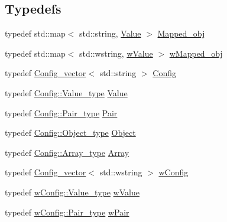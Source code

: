 \subsection*{Typedefs}
\begin{DoxyCompactItemize}
\item 
typedef std\+::map$<$ std\+::string, \hyperlink{namespacejson__spirit_a28e6abc99fda7b06c430ca38802527a3}{Value} $>$ \hyperlink{namespacejson__spirit_a739353ac8509b778792f15eed140b5e8}{Mapped\+\_\+obj}
\item 
typedef std\+::map$<$ std\+::wstring, \hyperlink{namespacejson__spirit_a048cde4e921b6f41cbc0fab1cbc352e8}{w\+Value} $>$ \hyperlink{namespacejson__spirit_a4cc7fea4369942dbce7b920fe9d62eab}{w\+Mapped\+\_\+obj}
\item 
typedef \hyperlink{structjson__spirit_1_1_config__vector}{Config\+\_\+vector}$<$ std\+::string $>$ \hyperlink{namespacejson__spirit_aaf9079ef41a2fa7db0861c24b89d4254}{Config}
\item 
typedef \hyperlink{structjson__spirit_1_1_config__vector_aa06382368ae0d04aa77534d6f73592c8}{Config\+::\+Value\+\_\+type} \hyperlink{namespacejson__spirit_a28e6abc99fda7b06c430ca38802527a3}{Value}
\item 
typedef \hyperlink{structjson__spirit_1_1_config__vector_ae65b82636d991e02baba4eb5ddfbd0d1}{Config\+::\+Pair\+\_\+type} \hyperlink{namespacejson__spirit_a7200dfb0c24dea92f37dfd20c1a354c1}{Pair}
\item 
typedef \hyperlink{structjson__spirit_1_1_config__vector_a070c3d1a0aea6da7c24a60400d52f15d}{Config\+::\+Object\+\_\+type} \hyperlink{namespacejson__spirit_aa1e2c4032be0d25e7b42eb17115dabb2}{Object}
\item 
typedef \hyperlink{structjson__spirit_1_1_config__vector_af33059c26ec27a5153b53dd4bd312815}{Config\+::\+Array\+\_\+type} \hyperlink{namespacejson__spirit_aee299e52bda3816039a53210cbbfea1a}{Array}
\item 
typedef \hyperlink{structjson__spirit_1_1_config__vector}{Config\+\_\+vector}$<$ std\+::wstring $>$ \hyperlink{namespacejson__spirit_ac076d3c2bcc063f3654a053b63ee9268}{w\+Config}
\item 
typedef \hyperlink{structjson__spirit_1_1_config__vector_aa06382368ae0d04aa77534d6f73592c8}{w\+Config\+::\+Value\+\_\+type} \hyperlink{namespacejson__spirit_a048cde4e921b6f41cbc0fab1cbc352e8}{w\+Value}
\item 
typedef \hyperlink{structjson__spirit_1_1_config__vector_ae65b82636d991e02baba4eb5ddfbd0d1}{w\+Config\+::\+Pair\+\_\+type} \hyperlink{namespacejson__spirit_a01eb532cdeea8e5fb47857e67444408c}{w\+Pair}

\end{DoxyCompactItemize}
